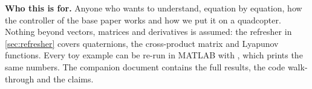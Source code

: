 \documentclass[11pt,a4paper]{article}
\begin{document}
\begin{titlepage}
  \vfill
  \begin{minipage}{0.9\linewidth}\small\color{cText}
  \textbf{Who this is for.} Anyone who wants to understand, equation by equation, how the controller of the base paper
  works and how we put it on a quadcopter. Nothing beyond vectors, matrices and derivatives is assumed: the
  refresher in \cref{sec:refresher} covers quaternions, the cross-product matrix and Lyapunov functions. Every toy example
  can be re-run in MATLAB with , which prints the same numbers. The companion document
   contains the full results, the code walk-through and the claims.
  \end{minipage}
\end{titlepage}

\tableofcontents
\newpage







\appendix

\end{document}
